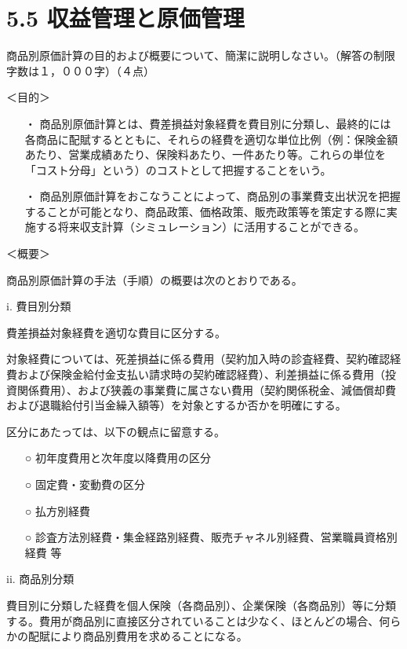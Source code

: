 \documentclass[report,gutter=10mm,fore-edge=10mm,uplatex,dvipdfmx]{jlreq}
\begin{document}
\section{5.5 収益管理と原価管理}
商品別原価計算の目的および概要について、簡潔に説明しなさい。（解答の制限字数は１，０００字）（４点）
\answer{}

＜目的＞

\begin{itemize}
 \item [ ・]  商品別原価計算とは、費差損益対象経費を費目別に分類し、最終的には各商品に配賦するとともに、それらの経費を適切な単位比例（例：保険金額あたり、営業成績あたり、保険料あたり、一件あたり等。これらの単位を「コスト分母」という）のコストとして把握することをいう。
 \item [ ・]  商品別原価計算をおこなうことによって、商品別の事業費支出状況を把握することが可能となり、商品政策、価格政策、販売政策等を策定する際に実施する将来収支計算（シミュレーション）に活用することができる。
\end{itemize}

＜概要＞

商品別原価計算の手法（手順）の概要は次のとおりである。

i. 費目別分類

費差損益対象経費を適切な費目に区分する。

対象経費については、死差損益に係る費用（契約加入時の診査経費、契約確認経費および保険金給付金支払い請求時の契約確認経費）、利差損益に係る費用（投資関係費用）、および狭義の事業費に属さない費用（契約関係税金、減価償却費および退職給付引当金繰入額等）を対象とするか否かを明確にする。

区分にあたっては、以下の観点に留意する。

\begin{itemize}
 \item [ ○]  初年度費用と次年度以降費用の区分
 \item [ ○]  固定費・変動費の区分
 \item [ ○]  払方別経費
 \item [ ○]  診査方法別経費・集金経路別経費、販売チャネル別経費、営業職員資格別経費 等
\end{itemize}

ii. 商品別分類

費目別に分類した経費を個人保険（各商品別）、企業保険（各商品別）等に分類する。費用が商品別に直接区分されていることは少なく、ほとんどの場合、何らかの配賦により商品別費用を求めることになる。
\end{document}
